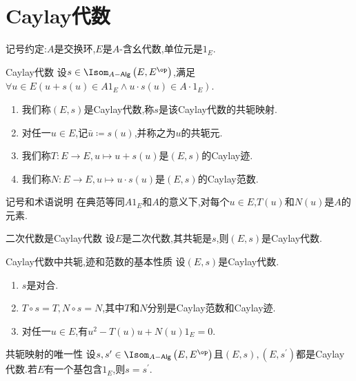 \section{Caylay代数}

记号约定:$A$是交换环,$E$是$A$-含幺代数,单位元是$1_{E}$.

\begin{definition}{Caylay代数}{}
	设$s\in\Isom_{A-\mathsf{Alg}}\left(E,E^{\op}\right)$,满足$\forall u\in E\left(u+s\left(u\right)\in A1_{E}\wedge u\cdot s\left(u\right)\in A\cdot 1_{E}\right)$.
	\begin{enumerate}
		\item 我们称$\left(E,s\right)$是Caylay代数,称$s$是该Caylay代数的共轭映射.
		\item 对任一$u\in E$,记$\bar{u}\coloneq s\left(u\right)$,并称之为$u$的共轭元.
		\item 我们称$T:E\to E,u\mapsto u+s\left(u\right)$是$\left(E,s\right)$的Caylay迹.
		\item 我们称$N:E\to E,u\mapsto u\cdot s\left(u\right)$是$\left(E,s\right)$的Caylay范数.
	\end{enumerate}
\end{definition}

\begin{remark}{记号和术语说明}{}
	在典范等同$A1_{E}$和$A$的意义下,对每个$u\in E$,$T\left(u\right)$和$N\left(u\right)$是$A$的元素.
\end{remark}

\begin{proposition}{二次代数是Caylay代数}{}
	设$E$是二次代数,其共轭是$s$,则$\left(E,s\right)$是Caylay代数.
\end{proposition}

\begin{proposition}{Caylay代数中共轭,迹和范数的基本性质}{}
	设$\left(E,s\right)$是Caylay代数.
	\begin{enumerate}
		\item $s$是对合.
		\item $T\circ s=T,N\circ s=N$,其中$T$和$N$分别是Caylay范数和Caylay迹.
		\item 对任一$u\in E$,有$u^{2}-T\left(u\right)u+N\left(u\right)1_{E}=0$.
	\end{enumerate}
\end{proposition}

\begin{proposition}{共轭映射的唯一性}{}
	设$s,s^{\prime}\in\Isom_{A-\mathsf{Alg}}\left(E,E^{\op}\right)$且$\left(E,s\right),\left(E,s^{\prime}\right)$都是Caylay代数.若$E$有一个基包含$1_{E}$,则$s=s^{\prime}$.
\end{proposition}

